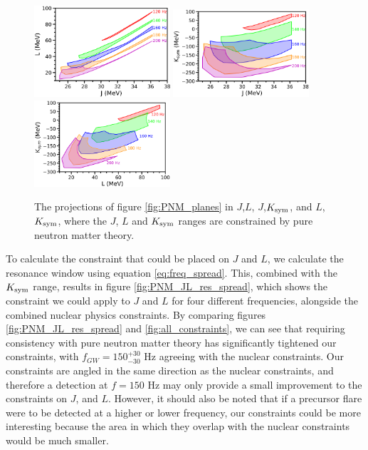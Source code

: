 \documentclass[fleqn,usenatbib]{mnras}
\begin{document}
\begin{figure}
\centering
\includegraphics[width=0.45\textwidth,angle=0]{PNM_JL}
\includegraphics[width=0.45\textwidth,angle=0]{PNM_JK}
\includegraphics[width=0.45\textwidth,angle=0]{PNM_LK}
\caption{The projections of figure \ref{fig:PNM_planes} in $J$,$L$, $J$,$K_{\rm sym}$, and $L$,$K_{\rm sym}$, where the $J$, $L$ and $K_{\rm sym}$ ranges are constrained by pure neutron matter theory.}
\label{fig:PNM_2d}
\end{figure}

To calculate the constraint that could be placed on $J$ and $L$, we calculate the resonance window using equation \ref{eq:freq_spread}. This, combined with the $K_{\rm sym}$ range, results in figure \ref{fig:PNM_JL_res_spread}, which shows the constraint we could apply to $J$ and $L$ for four different frequencies, alongside the combined nuclear physics constraints. By comparing figures \ref{fig:PNM_JL_res_spread} and \ref{fig:all_constraints}, we can see that requiring consistency with pure neutron matter theory has significantly tightened our constraints, with $f_{GW}=150^{+30}_{-30}$ Hz agreeing with the nuclear constraints. Our constraints are angled in the same direction as the nuclear constraints, and therefore a detection at $f=150$ Hz may only provide a small improvement to the constraints on $J$, and $L$. However, it should also be noted that if a precursor flare were to be detected at a higher or lower frequency, our constraints could be more interesting because the area in which they overlap with the nuclear constraints would be much smaller.
\end{document}
